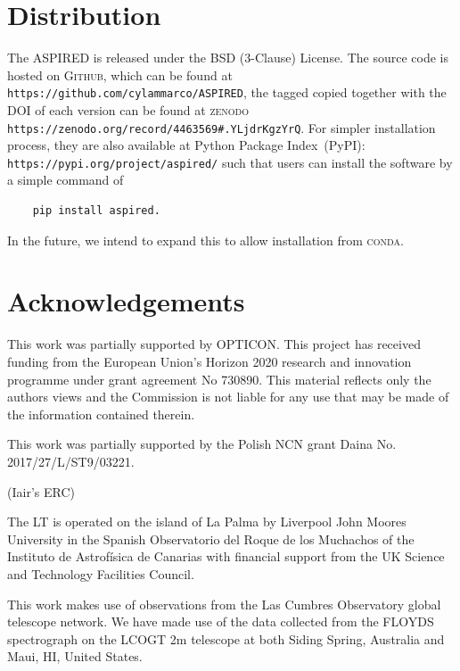 \documentclass[fleqn,usenatbib]{mnras}
\begin{document}

\section{Distribution}
The \textsc{ASPIRED} is released under the BSD (3-Clause) License. The
source code is hosted on \textsc{Github}, which can be found at
\verb+https://github.com/cylammarco/ASPIRED+, the tagged copied together
with the DOI of each version can be found at
\textsc{zenodo} \verb+https://zenodo.org/record/4463569#.YLjdrKgzYrQ+.
For simpler installation process, they are also available at Python
Package Index~(PyPI): \verb+https://pypi.org/project/aspired/+ such that
users can install the software by a simple command of 
\begin{verbatim}
    pip install aspired.
\end{verbatim}
In the future, we intend to expand this to allow installation from
\textsc{conda}.

\section*{Acknowledgements}
This work was partially supported by OPTICON. This project has
received funding from the European Union’s Horizon 2020 research and
innovation programme under grant agreement No 730890. This material
reflects only the authors views and the Commission is not liable for
any use that may be made of the information contained therein.

This work was partially supported by the Polish NCN grant Daina
No. 2017/27/L/ST9/03221.

(Iair's ERC)

The LT is operated on the island of La Palma by Liverpool
John Moores University in the Spanish Observatorio del Roque
de los Muchachos of the Instituto de Astrof{\'i}sica de Canarias with
financial support from the UK Science and Technology Facilities
Council.

This work makes use of observations from the Las Cumbres Observatory
global telescope network. We have made use of the data collected from
the FLOYDS spectrograph on the LCOGT 2m telescope at both Siding Spring,
Australia and Maui, HI, United States.

\end{document}

